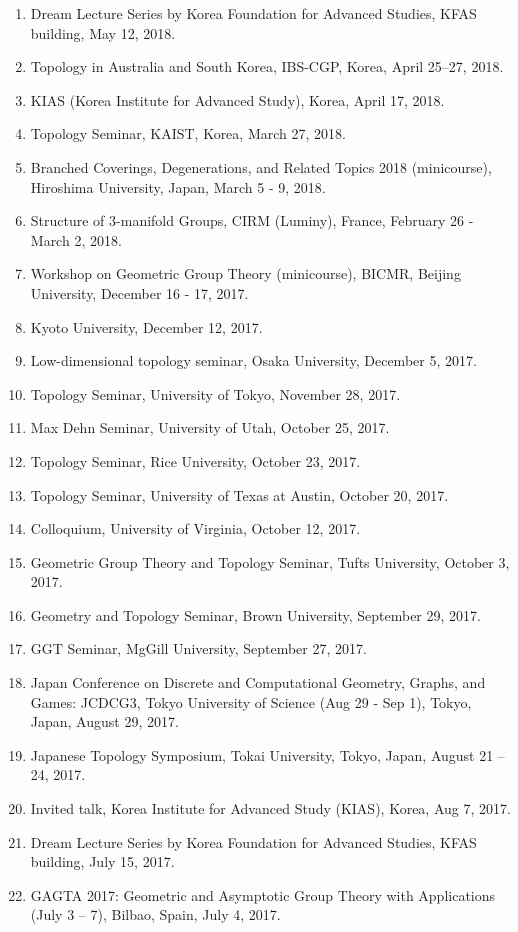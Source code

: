 \documentclass[11pt,a4paper]{article}
\begin{document}
\begin{enumerate}[leftmargin=1.5em, label=\arabic*.]
\item Dream Lecture Series by Korea Foundation for Advanced Studies, KFAS building, May 12, 2018.
\item Topology in Australia and South Korea, IBS-CGP, Korea, April 25--27, 2018.
\item KIAS (Korea Institute for Advanced Study), Korea, April 17, 2018.
\item Topology Seminar, KAIST, Korea, March 27, 2018.
\item Branched Coverings, Degenerations, and Related Topics 2018 (minicourse), Hiroshima University, Japan, March 5 - 9, 2018.
\item Structure of 3-manifold Groups, CIRM (Luminy), France, February 26 - March 2, 2018.
\item Workshop on Geometric Group Theory (minicourse), BICMR, Beijing University, December 16 - 17, 2017.
\item Kyoto University, December 12, 2017.
\item Low-dimensional topology seminar, Osaka University, December 5, 2017.
\item Topology Seminar, University of Tokyo, November 28, 2017.
\item Max Dehn Seminar, University of Utah, October 25, 2017.
\item Topology Seminar, Rice University, October 23, 2017.
\item Topology Seminar, University of Texas at Austin, October 20, 2017.
\item Colloquium, University of Virginia, October 12, 2017.
\item Geometric Group Theory and Topology Seminar, Tufts University, October 3, 2017.
\item Geometry and Topology Seminar, Brown University, September 29, 2017.
\item GGT Seminar, MgGill University, September 27, 2017.
\item Japan Conference on Discrete and Computational Geometry, Graphs, and Games: JCDCG3, Tokyo University of Science (Aug 29 - Sep 1), Tokyo, Japan, August 29, 2017.
\item Japanese Topology Symposium, Tokai University, Tokyo, Japan, August 21 -- 24, 2017.
\item Invited talk, Korea Institute for Advanced Study (KIAS), Korea, Aug 7, 2017.
\item Dream Lecture Series by Korea Foundation for Advanced Studies, KFAS building, July 15, 2017.
\item GAGTA 2017: Geometric and Asymptotic Group Theory with Applications (July 3 -- 7), Bilbao, Spain, July 4, 2017.

\end{enumerate}
\end{document}
